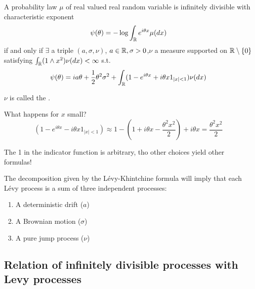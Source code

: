 \begin{theorem}\label{thm:4.2}
    A probability law $\mu$ of real valued real random variable is infinitely divisible with
    characteristic exponent
    \[\psi(\theta)=-\log\int_{\mathbb{R}} e^{i\theta x}\mu(dx)\]
    if and only if $\exists$ a triple $(a,\sigma,\nu)$, $a\in\mathbb{R},\sigma>0$,$\nu$ a measure supported on 
    $\mathbb{R}\setminus\{0\}$ satisfying $\int_{\mathbb{R}} (1\land x^2)\nu(dx)<\infty$ s.t.
    \[\psi(\theta)=ia\theta+\frac{1}{2}\theta^2\sigma^2+\int_{\mathbb{R}}(1-e^{i\theta x}+i\theta x 1_{|x|< 1})\nu(dx)\] 
\end{theorem}

\begin{aremark}
    $\nu$ is called the .
\end{aremark}

\begin{aremark}
    What happens for $x$ small? 
    \[(1-e^{i\theta x}-i\theta x 1_{|x|< 1})\approx 1- (1+i\theta x-\frac{\theta^2 x^2}{2})+i\theta x=\frac{\theta^2 x^2}{2}\]
\end{aremark}

\begin{aremark}
    The 1 in the indicator function is arbitrary, tho other choices yield other formulas!
\end{aremark}

\begin{aremark}

    The decomposition given by the Lévy-Khintchine formula will imply that each Lévy process is a sum of 
    three independent processes:
    \begin{enumerate}
        \item A deterministic drift ($a$)
        \item A Brownian motion ($\sigma$)
        \item A pure jump process ($\nu$)
    \end{enumerate}

\end{aremark}

\subsection{Relation of infinitely divisible processes with Levy processes}

